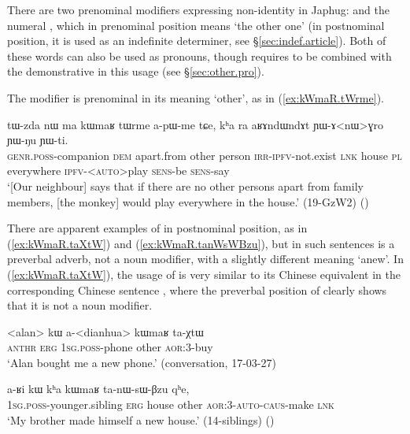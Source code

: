 There are two prenominal modifiers expressing non-identity in Japhug:  and the numeral , which in prenominal position means `the other one' (in postnominal position, it is used as an indefinite determiner, see §\ref{sec:indef.article}). Both of these words can also be used as pronouns, though  requires to be combined with the demonstrative  in this usage (see §\ref{sec:other.pro}).

The modifier  is prenominal in its meaning `other', as in (\ref{ex:kWmaR.tWrme}). 

\begin{exe}
\ex \label{ex:kWmaR.tWrme}
\gll tɯ-zda nɯ ma kɯmaʁ tɯrme a-pɯ-me tɕe, kʰa ra aʁɤndɯndɤt ɲɯ-ɤ<nɯ>ɣro ɲɯ-ŋu ɲɯ-ti. \\
\textsc{genr}.\textsc{poss}-companion \textsc{dem} apart.from other person \textsc{irr}-\textsc{ipfv}-not.exist \textsc{lnk} house \textsc{pl} everywhere \textsc{ipfv}-<\textsc{auto}>play \textsc{sens}-be \textsc{sens}-say \\
\glt `[Our neighbour] says that if there are no other persons apart from family members, [the monkey] would play everywhere in the house.' (19-GzW2)
()
\end{exe}

There are apparent examples of  in postnominal position, as in (\ref{ex:kWmaR.taXtW}) and (\ref{ex:kWmaR.tanWsWBzu}), but in such sentences  is a preverbal adverb, not a noun modifier, with a slightly different meaning `anew'. In (\ref{ex:kWmaR.taXtW}), the usage of  is very similar to its Chinese equivalent  in the corresponding Chinese sentence , where the preverbal position of  clearly shows that it is not a noun modifier. 

\begin{exe}
\ex \label{ex:kWmaR.taXtW}
\gll <alan> kɯ a-<dianhua> kɯmaʁ ta-χtɯ \\
\textsc{anthr} \textsc{erg} \textsc{1sg}.\textsc{poss}-phone other \textsc{aor}:3\flobv{}-buy \\
\glt `Alan bought me a new phone.' (conversation, 17-03-27)
\end{exe}

\begin{exe}
\ex \label{ex:kWmaR.tanWsWBzu}
\gll a-ʁi kɯ kʰa kɯmaʁ ta-nɯ-sɯ-βzu qʰe, \\
\textsc{1sg}.\textsc{poss}-younger.sibling \textsc{erg} house other \textsc{aor}:3\flobv{}-\textsc{auto}-\textsc{caus}-make \textsc{lnk} \\
\glt `My brother made himself a new house.' (14-siblings)
()
\end{exe}

